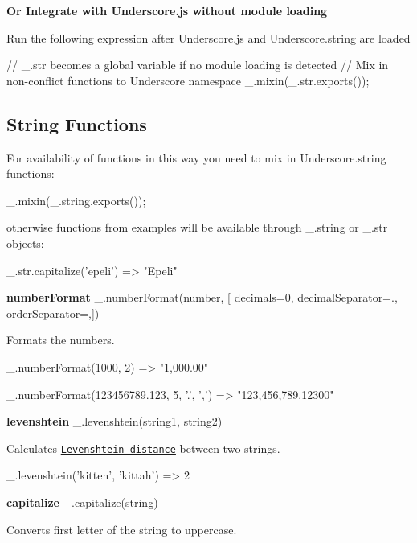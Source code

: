 {\bfseries Or Integrate with Underscore.\+js without module loading}

Run the following expression after Underscore.\+js and Underscore.\+string are loaded 
\begin{DoxyCode}
// \_.str becomes a global variable if no module loading is detected
// Mix in non-conflict functions to Underscore namespace
\_.mixin(\_.str.exports());
\end{DoxyCode}


\subsection*{String Functions}

For availability of functions in this way you need to mix in Underscore.\+string functions\+:


\begin{DoxyCode}
\_.mixin(\_.string.exports());
\end{DoxyCode}


otherwise functions from examples will be available through \+\_\+.\+string or \+\_\+.\+str objects\+:


\begin{DoxyCode}
\_.str.capitalize('epeli')
=> "Epeli"
\end{DoxyCode}


{\bfseries number\+Format} \+\_\+.\+number\+Format(number, \mbox{[} decimals=0, decimal\+Separator=\textquotesingle{}.\textquotesingle{}, order\+Separator=\textquotesingle{},\textquotesingle{}\mbox{]})

Formats the numbers.


\begin{DoxyCode}
\_.numberFormat(1000, 2)
=> "1,000.00"

\_.numberFormat(123456789.123, 5, '.', ',')
=> "123,456,789.12300"
\end{DoxyCode}


{\bfseries levenshtein} \+\_\+.\+levenshtein(string1, string2)

Calculates \href{http://en.wikipedia.org/wiki/Levenshtein_distance}{\tt Levenshtein distance} between two strings.


\begin{DoxyCode}
\_.levenshtein('kitten', 'kittah')
=> 2
\end{DoxyCode}


{\bfseries capitalize} \+\_\+.\+capitalize(string)

Converts first letter of the string to uppercase.


